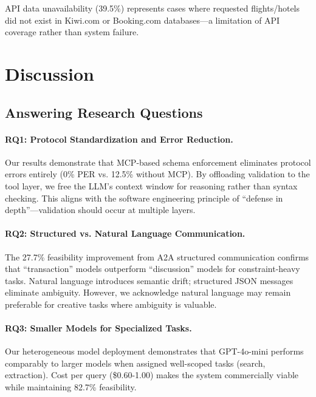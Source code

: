 \documentclass[preprint,review,12pt]{elsarticle}
\begin{document}
API data unavailability (39.5\%) represents cases where requested flights/hotels did not exist in Kiwi.com or Booking.com databases---a limitation of API coverage rather than system failure.

\section{Discussion}
\label{sec:discussion}

\subsection{Answering Research Questions}

\paragraph{RQ1: Protocol Standardization and Error Reduction.}
Our results demonstrate that MCP-based schema enforcement eliminates protocol errors entirely (0\% PER vs. 12.5\% without MCP). By offloading validation to the tool layer, we free the LLM's context window for reasoning rather than syntax checking. This aligns with the software engineering principle of ``defense in depth''---validation should occur at multiple layers.

\paragraph{RQ2: Structured vs. Natural Language Communication.}
The 27.7\% feasibility improvement from A2A structured communication confirms that ``transaction'' models outperform ``discussion'' models for constraint-heavy tasks. Natural language introduces semantic drift; structured JSON messages eliminate ambiguity. However, we acknowledge natural language may remain preferable for creative tasks where ambiguity is valuable.

\paragraph{RQ3: Smaller Models for Specialized Tasks.}
Our heterogeneous model deployment demonstrates that GPT-4o-mini performs comparably to larger models when assigned well-scoped tasks (search, extraction). Cost per query (\$0.60-1.00) makes the system commercially viable while maintaining 82.7\% feasibility.
\end{document}
